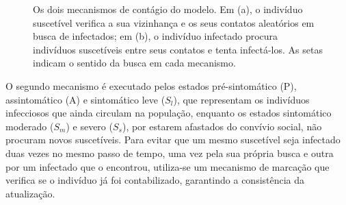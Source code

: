 \documentclass[
	12pt,				%
	openright,			%
	oneside,			%
	a4paper,			%
	english,			%
	french,				%
	spanish,			%
	brazil				%
	]{abntex2}
\begin{document}
\begin{figure}[H]
\centering
{}
\caption{Os dois mecanismos de contágio do modelo. Em (a), o indivíduo suscetível verifica a sua vizinhança e os seus contatos aleatórios em busca de infectados; em (b), o indivíduo infectado procura indivíduos suscetíveis entre seus contatos e tenta infectá-los. As setas indicam o sentido da busca em cada mecanismo.}
\label{fig:contagio}
\end{figure}

O segundo mecanismo é executado pelos estados pré-sintomático (P), assintomático (A) e sintomático leve ($S_l$), que representam os indivíduos infecciosos que ainda circulam na população, enquanto os estados sintomático moderado ($S_m$) e severo ($S_s$), por estarem afastados do convívio social, não procuram novos suscetíveis. Para evitar que um mesmo suscetível seja infectado duas vezes no mesmo passo de tempo, uma vez pela sua própria busca e outra por um infectado que o encontrou, utiliza-se um mecanismo de marcação que verifica se o indivíduo já foi contabilizado, garantindo a consistência da atualização.
\end{document}
